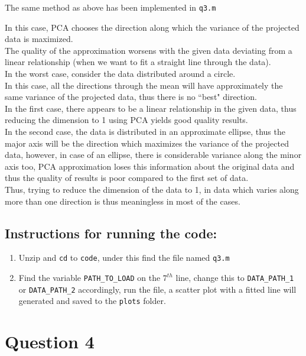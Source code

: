 \documentclass[11pt, fleqn]{article}
\begin{document}
\medskip
The same method as above has been implemented in \texttt{q3.m}

\medskip
In this case, PCA chooses the direction along which the variance of the projected data is maximized.\\
The quality of the approximation worsens with the given data deviating from a linear relationship (when we want to fit a straight line through the data).\\
In the worst case, consider the data distributed around a circle.\\
In this case, all the directions through the mean will have approximately the same variance of the projected data, thus there is no ``best" direction.\\
In the first case, there appears to be a linear relationship in the given data, thus reducing the dimension to 1 using PCA yields good quality results.\\
In the second case, the data is distributed in an approximate ellipse, thus the major axis will be the direction which maximizes the variance of the projected data, however, in case of an ellipse, there is considerable variance along the minor axis too, PCA approximation loses this information about the original data and thus the quality of results is poor compared to the first set of data.\\
Thus, trying to reduce the dimension of the data to 1, in data which varies along more than one direction is thus meaningless in most of the cases.

\subsection*{Instructions for running the code:}
\begin{enumerate}[itemsep=-1ex]
    \item Unzip and \texttt{cd} to \texttt{code}, under this find the file named \texttt{q3.m}
    \item Find the variable \texttt{PATH\_TO\_LOAD} on the $7^{th}$ line, change this to \texttt{DATA\_PATH\_1} or \texttt{DATA\_PATH\_2} accordingly, run the file, a scatter plot with a fitted line will generated and saved to the \texttt{plots} folder.
\end{enumerate}

\newpage
\section*{Question 4}
\setcounter{equation}{0}
\setcounter{figure}{0}
\end{document}
